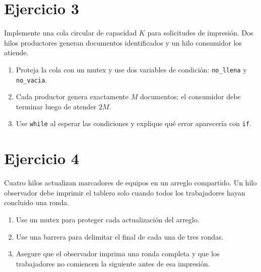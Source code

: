 \documentclass[12pt,a4paper]{article}
\begin{document}
\section*{Ejercicio 3}
Implemente una cola circular de capacidad $K$ para solicitudes de impresión. Dos hilos productores generan documentos identificados y un hilo consumidor los atiende.
\begin{enumerate}
    \item Proteja la cola con un mutex y use dos variables de condición: \texttt{no\_llena} y \texttt{no\_vacia}.
    \item Cada productor genera exactamente $M$ documentos; el consumidor debe terminar luego de atender $2M$.
    \item Use \texttt{while} al esperar las condiciones y explique qué error aparecería con \texttt{if}.
\end{enumerate}

\section*{Ejercicio 4}
Cuatro hilos actualizan marcadores de equipos en un arreglo compartido. Un hilo observador debe imprimir el tablero solo cuando todos los trabajadores hayan concluido una ronda.
\begin{enumerate}
    \item Use un mutex para proteger cada actualización del arreglo.
    \item Use una barrera para delimitar el final de cada una de tres rondas.
    \item Asegure que el observador imprima una ronda completa y que los trabajadores no comiencen la siguiente antes de esa impresión.
\end{enumerate}
\end{document}
